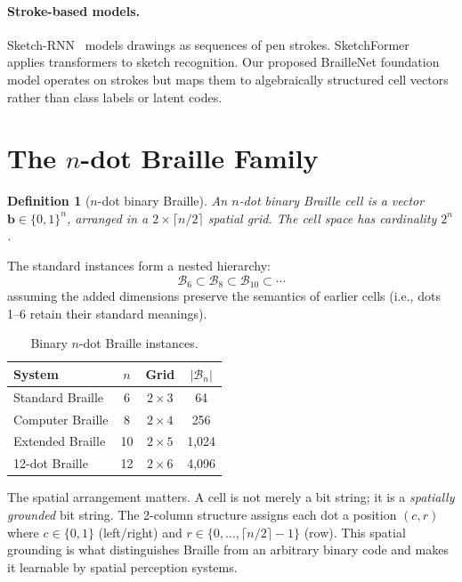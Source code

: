 \documentclass[11pt,a4paper]{article}
\newtheorem{definition}{Definition}
\newcommand{\B}{\mathcal{B}}
\newcommand{\bvec}{\bm{b}}
\begin{document}
\paragraph{Stroke-based models.}
Sketch-RNN~\cite{ha2018sketchrnn} models drawings as sequences
of pen strokes.
SketchFormer~\cite{ribeiro2020sketchformer} applies transformers
to sketch recognition.
Our proposed BrailleNet foundation model operates on strokes
but maps them to algebraically structured cell vectors
rather than class labels or latent codes.

\section{The \texorpdfstring{$n$}{n}-dot Braille Family}
\label{sec:ndot}

\begin{definition}[$n$-dot binary Braille]
  An $n$-dot binary Braille cell is a vector
  $\bvec \in \{0,1\}^n$,
  arranged in a $2 \times \lceil n/2 \rceil$ spatial grid.
  The cell space has cardinality $2^n$.
\end{definition}

The standard instances form a nested hierarchy:
\begin{equation}
  \B_6 \subset \B_8 \subset \B_{10} \subset \cdots
\end{equation}
assuming the added dimensions preserve the semantics of earlier cells
(i.e., dots 1--6 retain their standard meanings).

\begin{table}[h]
  \centering
  \begin{tabular}{@{}lccc@{}}
    \toprule
    System & $n$ & Grid & $|\B_n|$ \\
    \midrule
    Standard Braille & 6 & $2 \times 3$ & 64 \\
    Computer Braille & 8 & $2 \times 4$ & 256 \\
    Extended Braille & 10 & $2 \times 5$ & 1{,}024 \\
    12-dot Braille & 12 & $2 \times 6$ & 4{,}096 \\
    \bottomrule
  \end{tabular}
  \caption{Binary $n$-dot Braille instances.}
  \label{tab:ndot}
\end{table}

The spatial arrangement matters.
A cell is not merely a bit string; it is a \emph{spatially grounded}
bit string.
The 2-column structure assigns each dot a position $(c, r)$ where
$c \in \{0, 1\}$ (left/right) and $r \in \{0, \ldots, \lceil n/2 \rceil - 1\}$ (row).
This spatial grounding is what distinguishes Braille from an
arbitrary binary code and makes it learnable by spatial perception systems.
\end{document}
